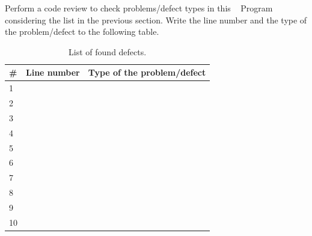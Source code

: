 \begin{exercise}
    Perform a code review to check problems/defect types in this \CC~ Program considering the list in the previous section. Write the line number and the type of the problem/defect to the following table.
    
    \begin{table}[H]
    \centering
    \renewcommand{\arraystretch}{1.2}
    \caption{List of found defects.}
    \label{tab:defects-ex}
    \begin{tabular}{p{}|p{}|p{}}
        \toprule
        \# & Line number & Type of the problem/defect\\
        \midrule
        1 & & \\
        \midrule
        2 & & \\
        \midrule
        3 & & \\
        \midrule
        4 & & \\
        \midrule
        5 & & \\
        \midrule
        6 & & \\
        \midrule
        7 & & \\
        \midrule
        8 & & \\
        \midrule
        9 & & \\
        \midrule
        10 & & \\
        \bottomrule
    \end{tabular}
\end{table}
\end{exercise}

